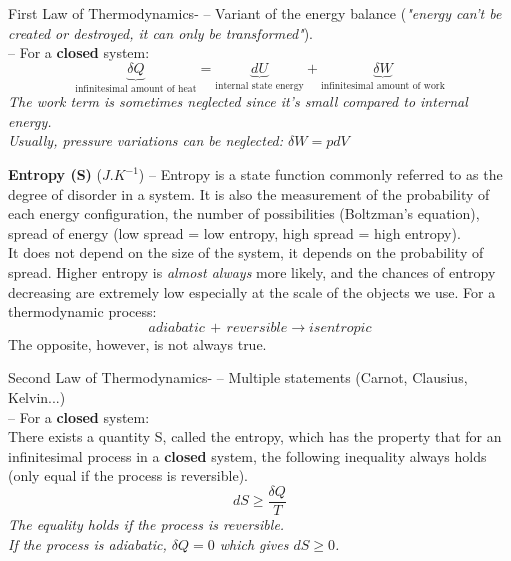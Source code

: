 \documentclass[a4paper,11pt]{article}
\begin{document}
\begin{theo}{First Law of Thermodynamics}-
-- Variant of the energy balance (\emph{"energy can't be created or destroyed, it can only be transformed"}).\\
-- For a \textbf{closed} system:
\[\underbrace{\delta Q}_\textrm{infinitesimal amount of heat} = \underbrace{dU}_\textrm{internal state energy} + \underbrace{\delta W}_\textrm{infinitesimal amount of work}\]
\emph{The work term is sometimes neglected since it's small compared to internal energy.}\\
\emph{Usually, pressure variations can be neglected: $\delta W=pdV$}
\end{theo}
\vspace{10pt}
\textbf{Entropy (S)} ($J.K^{-1}$) -- Entropy is a state function commonly referred to as the degree of disorder in a system. It is also the measurement of the probability of each energy configuration, the number of possibilities (Boltzman's equation), spread of energy (low spread = low entropy, high spread = high entropy).\\
It does not depend on the size of the system, it depends on the probability of spread. Higher entropy is \emph{almost always} more likely, and the chances of entropy decreasing are extremely low especially at the scale of the objects we use.
For a thermodynamic process:
\[adiabatic\,+\,reversible \rightarrow isentropic\]
The opposite, however, is not always true.\\
\begin{theo}{Second Law of Thermodynamics}-
-- Multiple statements (Carnot, Clausius, Kelvin...)\\
-- For a \textbf{closed} system:\\
There exists a quantity S, called the entropy, which has the property that for an infinitesimal process in a \textbf{closed} system, the following inequality always holds (only equal if the process is reversible).
\[ dS \geq \frac{\delta Q}{T} \]
\emph{The equality holds if the process is reversible.}\\
\emph{If the process is adiabatic, $\delta Q = 0$ which gives $dS \geq 0$.}
\end{theo}
\vspace{10pt}
\end{document}
